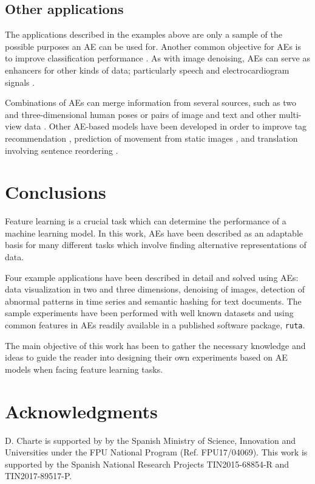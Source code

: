 \documentclass[
	fontsize=11pt, %
	twoside=false, %
	open=any, %
	secnumdepth=1, %
]{kaobook}
\begin{document}
\subsection{Other applications}
\label{sec.other}

The applications described in the examples above are only a sample of the possible purposes an AE can be used for. Another common objective for AEs is to improve classification performance \cite{ssae,xu2017}. As with image denoising, AEs can serve as enhancers for other kinds of data; particularly speech \cite{speech} and electrocardiogram signals \cite{ecg}.

Combinations of AEs can merge information from several sources, such as two and three-dimensional human poses \cite{multimodal} or pairs of image and text and other multi-view data \cite{advcae}. Other AE-based models have been developed in order to improve tag recommendation \cite{rsdae}, prediction of movement from static images \cite{uncertain}, and translation involving sentence reordering \cite{translation}.

\section{Conclusions}
\label{sec.conclusions}

Feature learning is a crucial task which can determine the performance of a machine learning model. In this work, AEs have been described as an adaptable basis for many different tasks which involve finding alternative representations of data. 

Four example applications have been described in detail and solved using AEs: data visualization in two and three dimensions, denoising of images, detection of abnormal patterns in time series and semantic hashing for text documents. The sample experiments have been performed with well known datasets and using common features in AEs readily available in a published software package, \texttt{ruta}.

The main objective of this work has been to gather the necessary knowledge and ideas to guide the reader into designing their own experiments based on AE models when facing feature learning tasks.

\section*{Acknowledgments}
D. Charte is supported by by the Spanish Ministry of Science, Innovation and Universities under the FPU National Program (Ref. FPU17/04069). This work is supported by the Spanish National Research Projects TIN2015-68854-R and TIN2017-89517-P.
\end{document}

